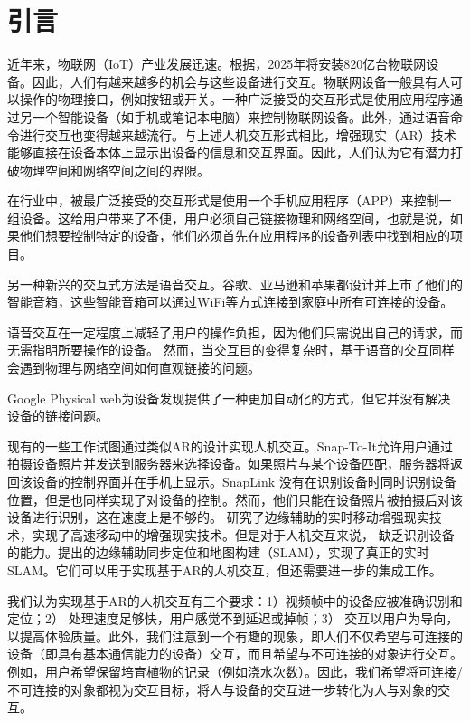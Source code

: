 \def\fr{30}
\def\edg{边缘服务端}
\def\fr{10}
\def\acc{72.7\%}
\def\idenT{93毫秒}
\def\uiT{20秒}

\chapter{引言}\label{sec:introduction}

近年来，物联网（IoT）产业发展迅速。根据\cite{macgillivray2019worldwide}，2025年将安装820亿台物联网设备。因此，人们有越来越多的机会与这些设备进行交互。物联网设备一般具有人可以操作的物理接口，例如按钮或开关。一种广泛接受的交互形式是使用应用程序通过另一个智能设备（如手机或笔记本电脑）来控制物联网设备\cite{homeass,xiaomi}。此外，通过语音命令进行交互也变得越来越流行\cite{li2019iot,porcheron2018voice}。与上述人机交互形式相比，增强现实（AR）技术能够直接在设备本体上显示出设备的信息和交互界面。因此，人们认为它有潜力打破物理空间和网络空间之间的界限。

在行业中，被最广泛接受的交互形式是使用一个手机应用程序（APP）来控制一组设备。这给用户带来了不便，用户必须自己链接物理和网络空间，也就是说，如果他们想要控制特定的设备，他们必须首先在应用程序的设备列表中找到相应的项目。

另一种新兴的交互式方法是语音交互。谷歌、亚马逊和苹果都设计并上市了他们的智能音箱，这些智能音箱可以通过WiFi等方式连接到家庭中所有可连接的设备。

语音交互在一定程度上减轻了用户的操作负担，因为他们只需说出自己的请求，而无需指明所要操作的设备。
然而，当交互目的变得复杂时，基于语音的交互同样会遇到物理与网络空间如何直观链接的问题。

Google Physical web\cite{jenson2014physical}为设备发现提供了一种更加自动化的方式，但它并没有解决设备的链接问题。

现有的一些工作试图通过类似AR的设计实现人机交互\cite{de2016snap,chen2018snaplink}。Snap-To-It\cite{de2016snap}允许用户通过拍摄设备照片并发送到服务器来选择设备。如果照片与某个设备匹配，服务器将返回该设备的控制界面并在手机上显示。SnapLink\cite{chen2018snaplink} 没有在识别设备时同时识别设备位置，但是也同样实现了对设备的控制。然而，他们只能在设备照片被拍摄后对该设备进行识别，这在速度上是不够的。\cite{liu2019edge} 研究了边缘辅助的实时移动增强现实技术，实现了高速移动中的增强现实技术。但是对于人机交互来说，\cite{liu2019edge} 缺乏识别设备的能力。\cite{ben2020edge,xu2020edge,liu2021edgesharing}提出的边缘辅助同步定位和地图构建（SLAM），实现了真正的实时SLAM。它们可以用于实现基于AR的人机交互，但还需要进一步的集成工作。

我们认为实现基于AR的人机交互有三个要求：1）视频帧中的设备应被准确识别和定位；2） 处理速度足够快，用户感觉不到延迟或掉帧；3） 交互以用户为导向，以提高体验质量。此外，我们注意到一个有趣的现象，即人们不仅希望与可连接的设备（即具有基本通信能力的设备）交互，而且希望与不可连接的对象进行交互。例如，用户希望保留培育植物的记录（例如浇水次数）。因此，我们希望将可连接/不可连接的对象都视为交互目标，将人与设备的交互进一步转化为人与对象的交互。

